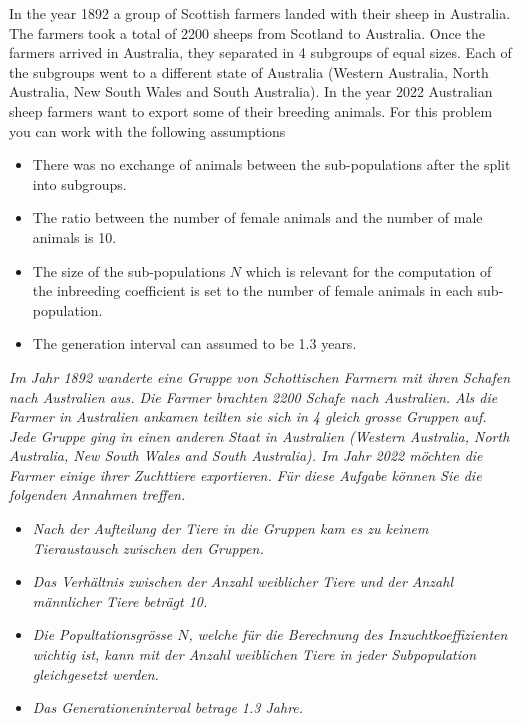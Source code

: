 \documentclass[
]{article}
\providecommand{\tightlist}{%
  \setlength{\itemsep}{0pt}\setlength{\parskip}{0pt}}
\begin{document}
In the year 1892 a group of Scottish farmers landed with their sheep in
Australia. The farmers took a total of 2200 sheeps from Scotland to
Australia. Once the farmers arrived in Australia, they separated in 4
subgroups of equal sizes. Each of the subgroups went to a different
state of Australia (Western Australia, North Australia, New South Wales
and South Australia). In the year 2022 Australian sheep farmers want to
export some of their breeding animals. For this problem you can work
with the following assumptions

\begin{itemize}
\tightlist
\item
  There was no exchange of animals between the sub-populations after the
  split into subgroups.
\item
  The ratio between the number of female animals and the number of male
  animals is 10.
\item
  The size of the sub-populations \(N\) which is relevant for the
  computation of the inbreeding coefficient is set to the number of
  female animals in each sub-population.
\item
  The generation interval can assumed to be 1.3 years.
\end{itemize}

\textit{Im Jahr 1892 wanderte eine Gruppe von Schottischen Farmern mit ihren Schafen nach Australien aus. Die Farmer brachten 2200 Schafe nach Australien. Als die Farmer in Australien ankamen teilten sie sich in 4 gleich grosse Gruppen auf. Jede Gruppe ging in einen anderen Staat in Australien (Western Australia, North Australia, New South Wales and South Australia). Im Jahr 2022 möchten die Farmer einige ihrer Zuchttiere exportieren. Für diese Aufgabe können Sie die folgenden Annahmen treffen.}

\begin{itemize}
\tightlist
\item
  \textit{Nach der Aufteilung der Tiere in die Gruppen kam es zu keinem Tieraustausch zwischen den Gruppen.}
\item
  \textit{Das Verhältnis zwischen der Anzahl weiblicher Tiere und der Anzahl männlicher Tiere beträgt 10.}
\item
  \textit{Die Popultationsgrösse $N$, welche für die Berechnung des Inzuchtkoeffizienten wichtig ist, kann mit der Anzahl weiblichen Tiere in jeder Subpopulation gleichgesetzt werden.}
\item
  \textit{Das Generationeninterval betrage 1.3 Jahre.}
\end{itemize}
\end{document}
